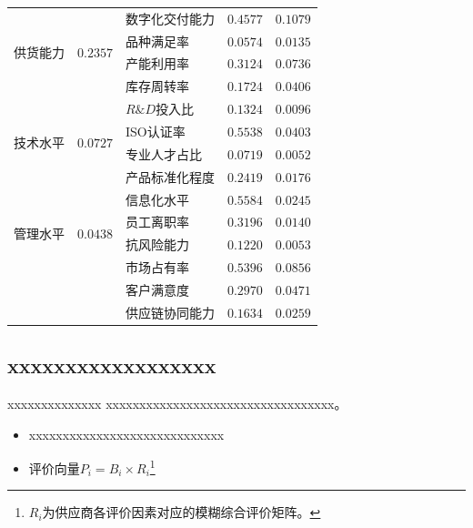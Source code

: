 \documentclass{beamer}
\begin{document}
\begin{frame}
\renewcommand{\arraystretch}{1.5}	
\begin{table}[h!]   
	\centering
	\scriptsize 
	\label{体系3}
	\begin{tabular}{lllll}    
		\toprule    
		\multirow{4}{2cm}{供货能力} &\multirow{4}{2cm}{$0.2357$}&数字化交付能力& $0.4577$ &$0.1079$  \\
		&&品种满足率& $0.0574$& $0.0135$\\
		&&产能利用率& $0.3124$&  $0.0736$\\
		&&库存周转率& $0.1724$ &$0.0406$\\
		\midrule   
\multirow{4}{2cm}{技术水平} &\multirow{4}{2cm}{$0.0727$} &$R\& D$投入比& $0.1324$ & $0.0096$\\
&&ISO认证率 &$0.5538$& $0.0403$ \\
&&专业人才占比& $0.0719$ & $0.0052$ \\
&&产品标准化程度 &$0.2419$& $0.0176$\\
\midrule   
\multirow{4}{2cm}{管理水平}  &	\multirow{4}{2cm}{$0.0438$}  &信息化水平 &$0.5584$ & $0.0245$ \\
&	&员工离职率& $0.3196$& $0.0140$\\
&&抗风险能力 &$0.1220$ &$0.0053$\\
\midrule   
\multirow{4}{2cm}{合作能力}  &\multirow{4}{2cm}{$0.1587$}&市场占有率 &$0.5396$ &$0.0856$\\
&&客户满意度& $0.2970$ & $0.0471$\\
&&供应链协同能力& $0.1634$ &$0.0259$\\
		\bottomrule   
	\end{tabular}  
\end{table}
\end{frame}

\subsection{xxxxxxxxxxxxxxxxxx}


\begin{frame}{xxxxxxxxxxxxxx}
	xxxxxxxxxxxxxxxxxxxxxxxxxxxxxxxxxx。
	
	\begin{itemize}
		\item xxxxxxxxxxxxxxxxxxxxxxxxxxxxx
		\item 评价向量$P_i=B_i\times R_i$\footnote{$R_i$为供应商各评价因素对应的模糊综合评价矩阵。}
	\end{itemize}
	
	
\end{frame}
\end{document}
